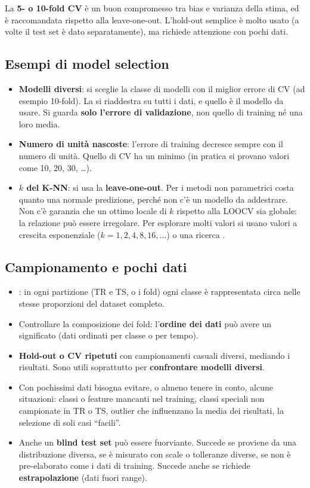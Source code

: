 La \textbf{5- o 10-fold CV} è un buon compromesso tra bias e varianza della stima, ed è raccomandata rispetto alla
leave-one-out. L'hold-out semplice è molto usato (a volte il test set è dato separatamente), ma richiede
attenzione con pochi dati.

\subsection{Esempi di model selection}
\begin{itemize}
  \item \textbf{Modelli diversi}: si sceglie la classe di modelli con il miglior errore di CV (ad esempio
        10-fold). La si riaddestra su tutti i dati, e quello è il modello da usare. Si guarda \textbf{solo
        l'errore di validazione}, non quello di training né una loro media.
  \item \textbf{Numero di unità nascoste}: l'errore di training decresce sempre con il numero di unità. Quello di
        CV ha un minimo (in pratica si provano valori come 10, 20, 30, \dots).
  \item \textbf{$k$ del K-NN}: si usa la \textbf{leave-one-out}. Per i metodi non parametrici costa quanto una
        normale predizione, perché non c'è un modello da addestrare. Non c'è garanzia che un ottimo locale di $k$
        rispetto alla LOOCV sia globale: la relazione può essere irregolare. Per esplorare molti valori si usano
        valori a crescita esponenziale ($k = 1,2,4,8,16,\dots$) o una ricerca .
\end{itemize}

\subsection{Campionamento e pochi dati}
\begin{itemize}
  \item {}: in ogni partizione (TR e TS, o i fold) ogni classe è rappresentata circa nelle
        stesse proporzioni del dataset completo.
  \item Controllare la composizione dei fold: l'\textbf{ordine dei dati} può avere un significato (dati ordinati
        per classe o per tempo).
  \item \textbf{Hold-out o CV ripetuti} con campionamenti casuali diversi, mediando i risultati. Sono utili
        soprattutto per \textbf{confrontare modelli diversi}.
  \item Con pochissimi dati bisogna evitare, o almeno tenere in conto, alcune situazioni: classi o feature
        mancanti nel training, classi speciali non campionate in TR o TS, outlier che influenzano la media dei
        risultati, la selezione di soli casi ``facili''.
  \item Anche un \textbf{blind test set} può essere fuorviante. Succede se proviene da una distribuzione diversa,
        se è misurato con scale o tolleranze diverse, se non è pre-elaborato come i dati di training. Succede anche
        se richiede \textbf{estrapolazione} (dati fuori range).
\end{itemize}

